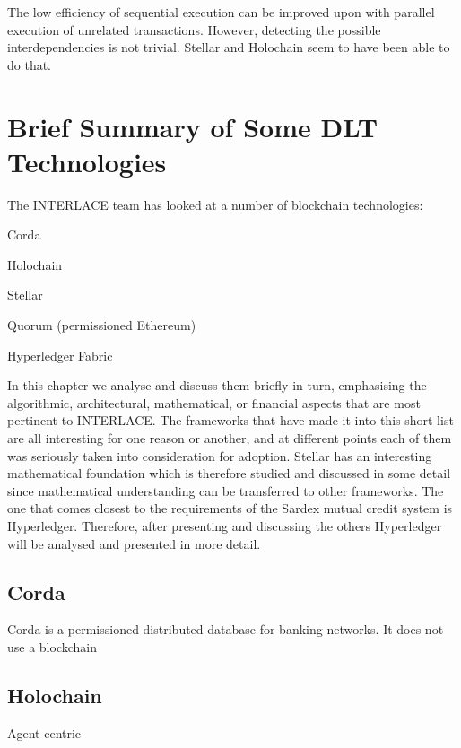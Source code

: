 The low efficiency of sequential execution can be improved upon with parallel execution of unrelated transactions. However, detecting the possible interdependencies is not trivial. Stellar and Holochain seem to have been able to do that.






\section{Brief Summary of Some DLT Technologies}

The INTERLACE team has looked at a number of blockchain technologies:
\begin{packed_item1}
\item Corda
\item Holochain
\item Stellar
\item Quorum (permissioned Ethereum)
\item Hyperledger Fabric
\end{packed_item1}
In this chapter we analyse and discuss them briefly in turn, emphasising the algorithmic, architectural,  mathematical, or financial aspects that are most pertinent to INTERLACE. The frameworks that have made it into this short list are all interesting for one reason or another, and at different points each of them was seriously taken into consideration for adoption. Stellar has an interesting mathematical foundation which is therefore studied and discussed in some detail since mathematical understanding can be transferred to other frameworks. The one that comes closest to the requirements of the Sardex mutual credit system is Hyperledger. Therefore, after presenting and discussing the others Hyperledger will be analysed and presented in more detail.


\subsection{Corda}
Corda \cite{Hearn2016} is a permissioned distributed database for banking networks. It does not use a blockchain



\subsection{Holochain}
Agent-centric
\cite{HarrisBrownEtAl2018}








